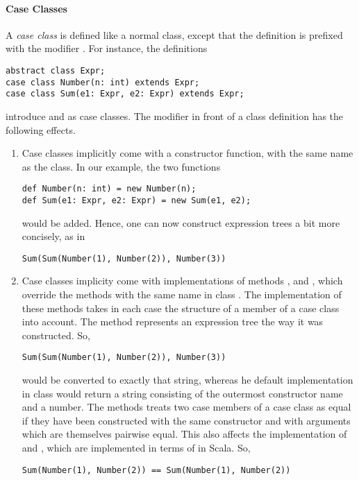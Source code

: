 \documentclass[a4paper,12pt,twoside,titlepage]{book}
\begin{document}
\paragraph{Case Classes}
A {\em case class} is defined like a normal class, except that the definition
is prefixed with the modifier .  For instance, the definitions
\begin{lstlisting}
abstract class Expr;
case class Number(n: int) extends Expr;
case class Sum(e1: Expr, e2: Expr) extends Expr;
\end{lstlisting}
introduce  and  as case classes.
The  modifier in front of a class definition has the following effects.
\begin{enumerate}
\item Case classes implicitly come with a constructor function, with the same name as the class. In our example, the two functions
\begin{lstlisting}
def Number(n: int) = new Number(n);
def Sum(e1: Expr, e2: Expr) = new Sum(e1, e2);
\end{lstlisting}
would be added. Hence, one can now construct expression trees a bit more concisely, as in
\begin{lstlisting}
Sum(Sum(Number(1), Number(2)), Number(3))
\end{lstlisting} 
\item Case classes implicity come with implementations of methods
,  and , which override the
methods with the same name in class . The implementation
of these methods takes in each case the structure of a member of a
case class into account. The  method represents an
expression tree the way it was constructed. So,
\begin{lstlisting}
Sum(Sum(Number(1), Number(2)), Number(3))
\end{lstlisting} 
would be converted to exactly that string, whereas he default
implementation in class  would return a string consisting
of the outermost constructor name  and a number.  The
 methods treats two case members of a case class as equal
if they have been constructed with the same constructor and with
arguments which are themselves pairwise equal. This also affects the
implementation of \code{==} and \code{!=}, which are implemented in
terms of  in Scala. So,
\begin{lstlisting}
Sum(Number(1), Number(2)) == Sum(Number(1), Number(2))
\end{lstlisting}

\end{enumerate}
\end{document}
